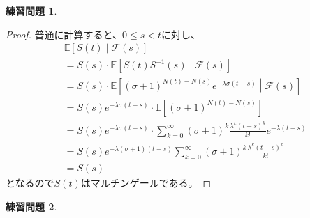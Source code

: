 \documentclass[uplatex]{jsarticle}
\theoremstyle{definition}
\newtheorem{prob}[prob]{練習問題}
\def\E{\mathbb{E}}
\def\mcF{\mathcal{F}}
\begin{document}
\begin{prob}\label{prob: 11.3}
\end{prob}

\begin{proof}
  普通に計算すると、\(0\leq s < t\)に対し、
  \begin{align*}
    &\E\left[S(t)\middle|\mcF(s)\right] \\
    &= S(s)\cdot \E\left[ S(t)S^{-1}(s)\middle|\mcF(s)\right] \\
    &= S(s)\cdot \E\left[
    (\sigma + 1)^{N(t)-N(s)}e^{-\lambda\sigma(t-s)}
    \middle|\mcF(s)\right] \\
    &= S(s)e^{-\lambda\sigma(t-s)}\cdot
    \E\left[ (\sigma + 1)^{N(t)-N(s)} \right] \\
    &= S(s)e^{-\lambda\sigma(t-s)}\cdot
    \sum_{k=0}^{\infty}(\sigma + 1)^k\frac{\lambda^k(t-s)^k}{k!}
    e^{-\lambda(t-s)}\\
    &= S(s)e^{-\lambda (\sigma+1)(t-s)}
    \sum_{k=0}^{\infty}(\sigma + 1)^k\frac{\lambda^k(t-s)^k}{k!} \\
    &= S(s)
  \end{align*}
  となるので\(S(t)\)はマルチンゲールである。
\end{proof}

















\begin{prob}\label{prob: 11.4}
\end{prob}
\end{document}
